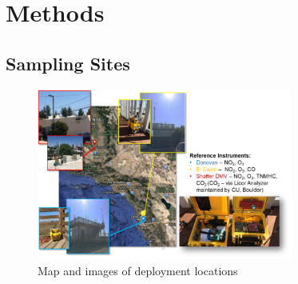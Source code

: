 \documentclass[journal abbreviation, manuscript]{copernicus}
\begin{document}

\section{Methods}

\subsection{Sampling Sites}\label{SamplingSites}

\begin{figure}
\centering
\includegraphics[width=0.75\textwidth]{writeup/img/MSdeployment.png}
\caption{Map and images of deployment locations}
\label{fig:img-label}
\end{figure}
\end{document}
